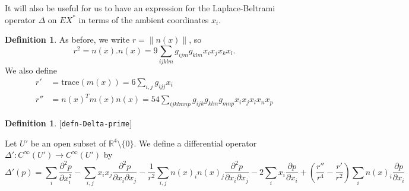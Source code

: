 \documentclass[reqno]{amsart}
\newcommand{\lbl}[1]{\label{#1}\textup{[\texttt{#1}]}\par}
\newcommand{\lbl}{\label}
\newcommand{\Dl}        {\Delta}
\newcommand{\R}         {{\mathbb{R}}}
\newcommand{\sm}        {\setminus}
\renewcommand{\:}{\colon}
\theoremstyle{definition}
\newtheorem{definition}[theorem]{Definition}
\begin{document}
It will also be useful for us to have an expression for the
Laplace-Beltrami operator $\Dl$ on $EX^*$ in terms of the ambient
coordinates $x_i$.

\begin{definition}
 As before, we write $r=\|n(x)\|$, so
 \[ r^2 = n(x).n(x) = 9\sum_{ijklm}g_{ijm}g_{klm}x_ix_jx_kx_l. \]
 We also define
 \begin{align*}
  r' &= \text{trace}(m(x)) = 6\sum_{i,j} g_{ijj}x_i  \\
  r'' &= n(x)^T m(x) n(x)
       = 54 \sum_{ijklmnp} g_{ijk}g_{klm}g_{mnp}x_ix_jx_lx_nx_p
 \end{align*}
\end{definition}

\begin{definition}\lbl{defn-Delta-prime}
 Let $U'$ be an open subset of $\R^4\sm\{0\}$.  We define a
 differential operator $\Dl'\:C^\infty(U')\to C^\infty(U')$ by
 \[ \Dl'(p) =
    \sum_i \frac{\partial^2p}{\partial x_i^2}
    - \sum_{i,j} x_ix_j \frac{\partial^2p}{\partial x_i\partial x_j}
    - \frac{1}{r^2} \sum_{i,j} n(x)_i n(x)_j
         \frac{\partial^2p}{\partial x_i\partial x_j}
    - 2\sum_i x_i\frac{\partial p}{\partial x_i}
    + \left(\frac{r''}{r^4}-\frac{r'}{r^2}\right)
       \sum_i n(x)_i\frac{\partial p}{\partial x_i}
 \]
\end{definition}
\end{document}
